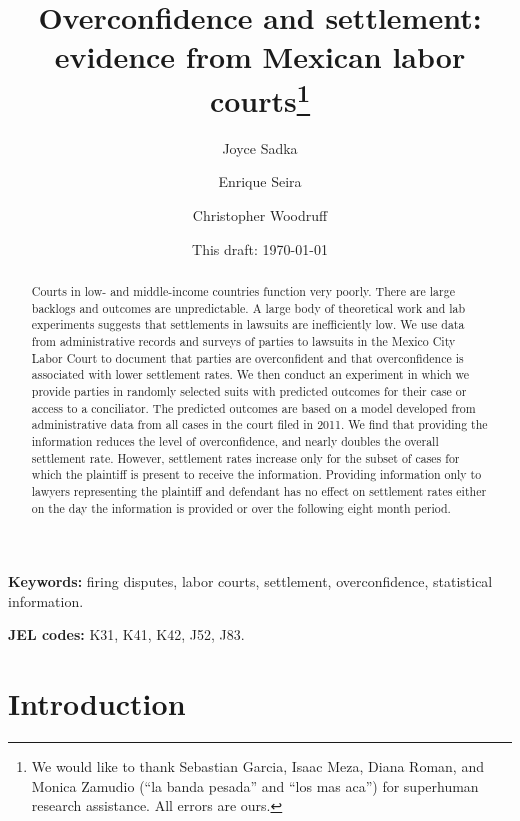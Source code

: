 \documentclass[11pt]{article}
\begin{document}
\title{Overconfidence and settlement: evidence from Mexican labor courts\thanks{We would like to thank Sebastian Garcia, Isaac Meza, Diana Roman, and Monica Zamudio (``la banda pesada'' and ``los mas aca'') for superhuman research assistance.  All errors are ours.}}
\author{Joyce Sadka \and Enrique Seira  \and Christopher Woodruff }
\date{This draft:  \today \\[2 cm]}



\maketitle
\begin{abstract}
 Courts in low- and middle-income countries function very poorly. There are large backlogs and outcomes are unpredictable. A large body of theoretical work and lab experiments suggests that settlements in lawsuits are inefficiently low. We use data from administrative records and surveys of parties to lawsuits in the Mexico City Labor Court to document that parties are overconfident and that overconfidence is associated with lower settlement rates. We then conduct an experiment in which we provide parties in randomly selected suits with predicted outcomes for their case or access to a conciliator. The predicted outcomes are based on a model developed from administrative data from all cases in the court filed in 2011. We find that providing the information reduces the level of overconfidence, and nearly doubles the overall settlement rate. However, settlement rates increase only for the subset of cases for which the plaintiff is present to receive the information. Providing information only to lawyers representing the plaintiff and defendant has no effect on settlement rates either on the day the information is provided or over the following eight month period. 
\end{abstract}

\textbf{Keywords: } firing disputes, labor courts, settlement, overconfidence, statistical information.

\textbf{JEL codes: } K31, K41, K42, J52, J83.

\newpage



\section{Introduction}
\end{document}
